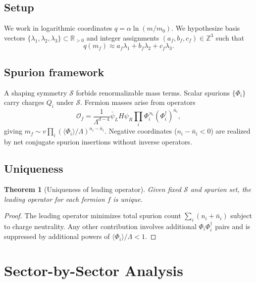 ﻿\documentclass[11pt]{article}
\newtheorem{theorem}{Theorem}[section]
\newcommand{\R}{\mathbb{R}}
\newcommand{\Z}{\mathbb{Z}}
\begin{document}
\subsection{Setup}

We work in logarithmic coordinates $q=\alpha\ln(m/m_0)$. We hypothesize
basis vectors $\{\lambda_1,\lambda_2,\lambda_3\}\subset\R_{>0}$ and integer
assignments $(a_f,b_f,c_f)\in\Z^3$ such that
\begin{equation}\label{eq:lattice}
q(m_f)\approx a_f\lambda_1+b_f\lambda_2+c_f\lambda_3.
\end{equation}

\subsection{Spurion framework}

A shaping symmetry $\mathcal{S}$ forbids renormalizable mass terms. Scalar
spurions $\{\Phi_i\}$ carry charges $Q_i$ under $\mathcal{S}$. Fermion
masses arise from operators
\begin{equation}\label{eq:operator}
\mathcal{O}_f=\frac{1}{\Lambda^{d-4}}\bar\psi_L H\psi_R
\prod_i\Phi_i^{\,n_i}(\Phi_i^\dagger)^{\bar n_i},
\end{equation}
giving $m_f\sim v\prod_i(\langle\Phi_i\rangle/\Lambda)^{n_i-\bar n_i}$.
Negative coordinates ($n_i-\bar n_i<0$) are realized by net conjugate
spurion insertions without inverse operators.

\subsection{Uniqueness}

\begin{theorem}[Uniqueness of leading operator]\label{thm:uniqueness}
Given fixed $\mathcal{S}$ and spurion set, the leading operator for each
fermion $f$ is unique.
\end{theorem}

\begin{proof}
The leading operator minimizes total spurion count $\sum_i(n_i+\bar n_i)$
subject to charge neutrality. Any other contribution involves additional
$\Phi_i\Phi_i^\dagger$ pairs and is suppressed by additional powers of
$\langle\Phi_i\rangle/\Lambda<1$.
\end{proof}

\section{Sector-by-Sector Analysis}
\label{sec:sectors}
\end{document}
